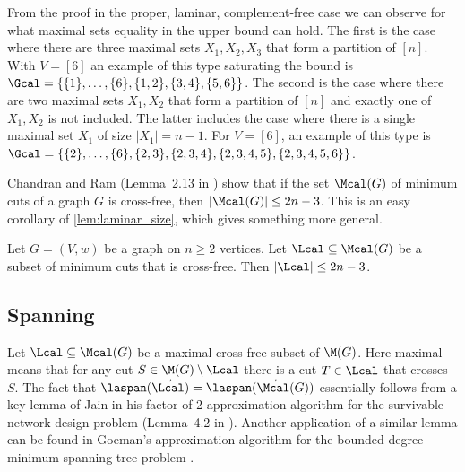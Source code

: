 \begin{remark}
From the proof in the proper, laminar, complement-free case we can observe for what maximal sets equality in the upper bound can hold.  The first is the case where there are three maximal sets
$X_1, X_2, X_3$ that form a partition of $[n]$.  With $V=[6]$ an example of this type saturating the bound is
$\Gcal = \{ \{1\}, \ldots, \{6\}, \{1,2\}, \{3,4\}, \{5,6\} \}$.  The second is the case where there are two maximal sets $X_1,X_2$ that form a
partition of $[n]$ and exactly one of $X_1,X_2$ is not included.  The latter includes the case where there is a single maximal set $X_1$ of size $|X_1| = n-1$.
For $V=[6]$, an example of this type is $\Gcal = \{\{2\}, \ldots, \{6\}, \{2,3\},\{2,3,4\},\{2,3,4,5\},\{2,3,4,5,6\}\}$.
\end{remark}

Chandran and Ram (Lemma~2.13 in \cite{CR04}) show that if the set $\Mcal(G)$ of minimum cuts of a
graph $G$ is cross-free, then $|\Mcal (G)| \le 2n-3$.  This is an
easy corollary of \cref{lem:laminar_size}, which gives something more general.

\begin{corollary}
\label{cor:cross-free_size}
Let $G = (V,w)$ be a graph on $n \ge 2$ vertices.
Let $\Lcal \subseteq \Mcal(G)$ be a subset of minimum cuts that is cross-free.  Then
$|\Lcal| \le 2n-3$.
\end{corollary}

\subsection{Spanning}
Let $\Lcal \subseteq \Mcal(G)$ be a maximal cross-free subset of $\M(G)$.  Here maximal means that for any cut $S \in \M(G) \setminus \Lcal$ there
is a cut $T \in \Lcal$ that crosses $S$.  The fact that $\laspan(\vec{\Lcal}) = \laspan(\vec{\Mcal}(G))$
essentially follows from a key lemma of Jain in his factor of 2 approximation algorithm for the survivable network design problem (Lemma~4.2 in \cite{Jain01}).
Another application of a similar lemma can be found in Goeman's approximation algorithm for the bounded-degree minimum spanning tree problem \cite{Goemans06}.

